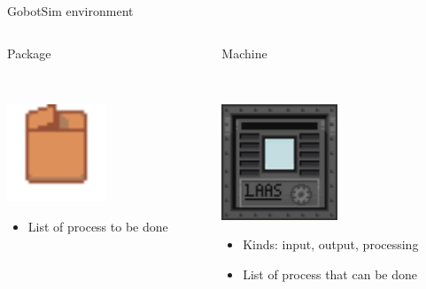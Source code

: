 \begin{frame}{GobotSim environment}
    \begin{columns}[t]
        \begin{column}{0.32\textwidth}
            \centering
            Package

            ~~

            \includegraphics[width = 0.5\textwidth]{images/godot/package.png}
            \small
            \begin{itemize}
                \item List of process to be done
            \end{itemize}
        \end{column}
        \pause
        \begin{column}{0.32\textwidth}
            \centering
            Machine

            ~~

            \includegraphics[width = 0.5\textwidth]{images/godot/machine_texture.png}
            \small
            \begin{itemize}
                \item Kinds: input, output, processing
                \item List of process that can be done
            \end{itemize}


\end{column}
\end{columns}
\end{frame}
